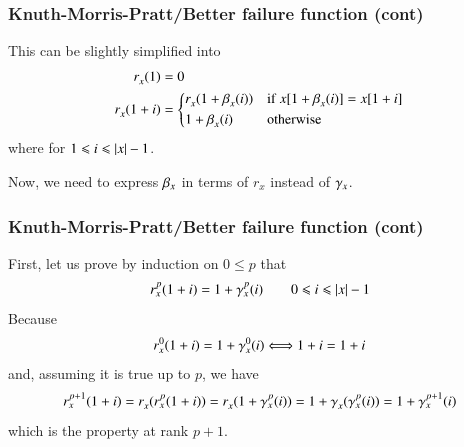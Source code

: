 %
\begin{frame}
\frametitle{Knuth-Morris-Pratt/Better failure function (cont)}

This can be slightly simplified into
\begin{align*}
   r_{x}^{}(1)
&= 0\\
   r_{x}^{}(1+i)
&= \left\lbrace
   \begin{aligned}
   & r_{x}^{}(1 + \beta_{x}^{}(i))
   && \text{if} \; x [1 + \beta_{x}^{}(i)] = x [1 + i]\\
   & 1 + \beta_{x}^{}(i)
   && \text{otherwise}
   \end{aligned}
   \right.
\end{align*}
where for \(1 \leqslant i \leqslant \lvert{x}\lvert{}-1\).

\bigskip

Now, we need to express \(\beta_{x}\) in terms of \(r_{x}\)
instead of \(\gamma_{x}\).

\end{frame}

%
\begin{frame}
\frametitle{Knuth-Morris-Pratt/Better failure function (cont)}

First, let us prove by induction on \(0 \leqslant p\) that
\[
r_{x}^{p}(1+i) = 1 + \gamma_{x}^{p}(i) \qquad 0 \leqslant i
\leqslant \lvert{x}\lvert{} - 1
\]
Because
\[
r_{x}^{0}(1+i) = 1 + \gamma_{x}^{0}(i)
\Longleftrightarrow
1 + i = 1 + i
\]
and, assuming it is true up to \(p\), we have
\[
  r_{x}^{p+1}(1+i)
= r_{x}^{}(r_{x}^{p}(1+i)) = r_{x}^{}(1 + \gamma_{x}^{p}(i))
= 1 + \gamma_{x}^{}(\gamma_{x}^{p}(i))
= 1 + \gamma_{x}^{p+1}(i)
\]
which is the property at rank \(p+1\).

\end{frame}

